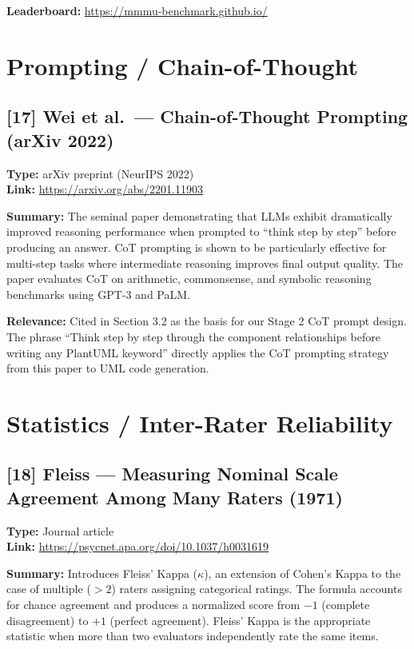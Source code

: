 \documentclass[11pt]{article}
\begin{document}
\textbf{Leaderboard:} \url{https://mmmu-benchmark.github.io/}

\section{Prompting / Chain-of-Thought}

\subsection*{[17] Wei et al.\ — Chain-of-Thought Prompting (arXiv 2022)}
\textbf{Type:} arXiv preprint (NeurIPS 2022) \\
\textbf{Link:} \url{https://arxiv.org/abs/2201.11903}

\textbf{Summary:} The seminal paper demonstrating that LLMs exhibit dramatically improved reasoning performance when prompted to ``think step by step'' before producing an answer. CoT prompting is shown to be particularly effective for multi-step tasks where intermediate reasoning improves final output quality. The paper evaluates CoT on arithmetic, commonsense, and symbolic reasoning benchmarks using GPT-3 and PaLM.

\textbf{Relevance:} Cited in Section 3.2 as the basis for our Stage 2 CoT prompt design. The phrase ``Think step by step through the component relationships before writing any PlantUML keyword'' directly applies the CoT prompting strategy from this paper to UML code generation.

\section{Statistics / Inter-Rater Reliability}

\subsection*{[18] Fleiss — Measuring Nominal Scale Agreement Among Many Raters (1971)}
\textbf{Type:} Journal article \\
\textbf{Link:} \url{https://psycnet.apa.org/doi/10.1037/h0031619}

\textbf{Summary:} Introduces Fleiss' Kappa ($\kappa$), an extension of Cohen's Kappa to the case of multiple ($>2$) raters assigning categorical ratings. The formula accounts for chance agreement and produces a normalized score from $-1$ (complete disagreement) to $+1$ (perfect agreement). Fleiss' Kappa is the appropriate statistic when more than two evaluators independently rate the same items.
\end{document}
